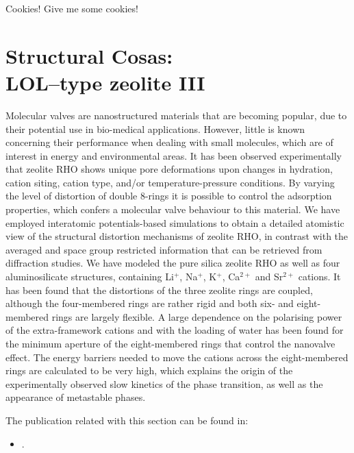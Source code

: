 %
\begin{savequote}[0.49\textwidth]
Cookies! Give me some cookies!
\end{savequote}
\chapter{Structural Cosas:\\ LOL--type zeolite III}
\label{chap_RHO2}
Molecular valves are nanostructured materials that are becoming popular, due to their potential use in bio-medical applications. However, little is known concerning their performance when dealing with small molecules, which are of interest in energy and environmental areas. It has been observed experimentally that zeolite RHO shows unique pore deformations upon changes in hydration, cation siting, cation type, and/or temperature-pressure conditions. By varying the level of distortion of double 8-rings it is possible to control the adsorption properties, which confers a molecular valve behaviour to this material. We have employed interatomic potentials-based simulations to obtain a detailed atomistic view of the structural distortion mechanisms of zeolite RHO, in contrast with the averaged and space group restricted information that can be retrieved from diffraction studies. We have modeled the pure silica zeolite RHO as well as four aluminosilicate structures, containing Li$^+$, Na$^+$, K$^+$, Ca$^{2+}$ and Sr$^{2+}$ cations. It has been found that the distortions of the three zeolite rings are coupled, although the four-membered rings are rather rigid and both six- and eight-membered rings are largely flexible. A large dependence on the polarising power of the extra-framework cations and with the loading of water has been found for the minimum aperture of the eight-membered rings that control the nanovalve effect. The energy barriers needed to move the cations across the eight-membered rings are calculated to be very high, which explains the origin of the experimentally observed slow kinetics of the phase transition, as well as the appearance of metastable phases.


The publication related with this section can be found in:
\begin{small}
\begin{itemize}
\item {}.
\end{itemize}
\end{small}

